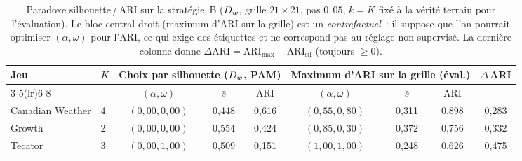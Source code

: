 
\begin{table}[H]
  \centering
  \small
  \renewcommand{\arraystretch}{1.2}
  \begin{tabular}{llccccccc}
    \toprule
    \textbf{Jeu} & $K$
    & \multicolumn{3}{c}{\textbf{Choix par silhouette} ($D_w$, PAM)}
    & \multicolumn{3}{c}{\textbf{Maximum d'ARI sur la grille} (éval.)}
    & $\Delta$\,ARI \\
    \cmidrule(lr){3-5}\cmidrule(lr){6-8}
    & & $(\alpha,\omega)$ & $\bar s$ & ARI & $(\alpha,\omega)$ & $\bar s$ & ARI & \\
    \midrule
  Canadian Weather & 4 & $(0{,}00,0{,}00)$ & 0{,}448 & 0{,}616 & $(0{,}55,0{,}80)$ & 0{,}311 & 0{,}898 & 0{,}283 \\
  Growth & 2 & $(0{,}00,0{,}00)$ & 0{,}554 & 0{,}424 & $(0{,}85,0{,}30)$ & 0{,}372 & 0{,}756 & 0{,}332 \\
  Tecator & 3 & $(0{,}00,1{,}00)$ & 0{,}509 & 0{,}151 & $(1{,}00,1{,}00)$ & 0{,}248 & 0{,}626 & 0{,}475 \\
    \bottomrule
  \end{tabular}
  \caption{Paradoxe silhouette\,/\,ARI sur la stratégie~B ($D_w$, grille $21\times 21$, pas $0{,}05$, $k=K$ fixé à la vérité terrain pour l'évaluation).
  Le bloc central droit (maximum d'ARI sur la grille) est un \emph{contrefactuel}~:
  il suppose que l'on pourrait optimiser $(\alpha,\omega)$ pour l'ARI, ce qui exige des étiquettes et ne correspond pas au réglage non supervisé.
  La dernière colonne donne $\Delta\mathrm{ARI} = \mathrm{ARI}_{\max} - \mathrm{ARI}_{\mathrm{sil}}$ (toujours $\ge 0$).}
  \label{tab:paradox_silhouette_ari}
\end{table}

